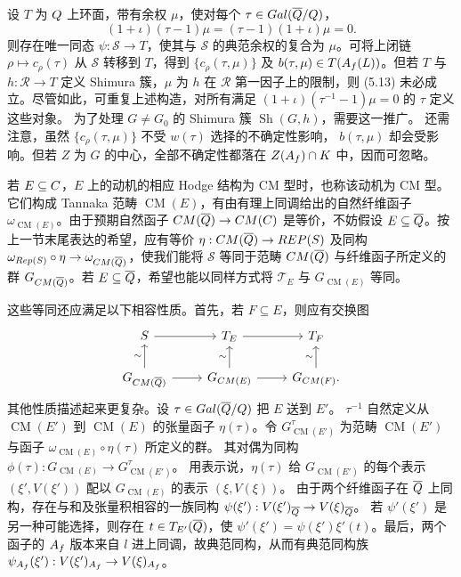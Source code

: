 设 $T$ 为 $Q$ 上环面，带有余权 $\mu$，使对每个
$\tau\in Gal(\overline{Q}/Q)$，
\begin{equation}
(1+\iota)(\tau-1)\mu=(\tau-1)(1+\iota)\mu=0.\tag{5.13}
\end{equation}
则存在唯一同态 $\psi:\mathcal S\to T$，使其与 $\mathcal S$ 的典范余权的复合为
$\mu$。可将上闭链 $\rho\mapsto c_\rho(\tau)$ 从 $\mathcal S$ 转移到 $T$，得到
$\{c_\rho(\tau,\mu)\}$ 及 $b(\tau,\mu)\in T(A_f(L))$。但若 $T$ 与
$h:\mathcal R\to T$ 定义 Shimura 簇，$\mu$ 为 $h$ 在 $\mathcal R$ 第一因子上的限制，则
(5.13) 未必成立。尽管如此，可重复上述构造，对所有满足
$(1+\iota)(\tau^{-1}-1)\mu=0$ 的 $\tau$ 定义这些对象。
为了处理 $G\ne G_0$ 的 Shimura 簇 $\operatorname{Sh}(G,h)$，需要这一推广。
还需注意，虽然 $\{c_\rho(\tau,\mu)\}$ 不受 $w(\tau)$ 选择的不确定性影响，
$b(\tau,\mu)$ 却会受影响。但若 $Z$ 为 $G$ 的中心，全部不确定性都落在
$Z(A_f)\cap K$ 中，因而可忽略。

若 $E\subseteq C$，$E$ 上的动机的相应 Hodge 结构为 CM 型时，也称该动机为 CM 型。
它们构成 Tannaka 范畴 $\operatorname{CM}(E)$，有由有理上同调给出的自然纤维函子
$\omega_{\operatorname{CM}(E)}$。由于预期自然函子
$CM(\overline{Q})\to CM(C)$ 是等价，不妨假设
$E\subseteq\overline{Q}$。按上一节末尾表达的希望，应有等价
$\eta:CM(\overline{Q})\to REP(S)$ 及同构
$\omega_{Rep(S)}\circ\eta\to\omega_{CM(\overline{Q})}$，使我们能将
$\mathcal S$ 等同于范畴 $CM(\overline{Q})$ 与纤维函子所定义的群
$G_{CM(\overline{Q})}$。若 $E\subseteq\overline{Q}$，希望也能以同样方式将
$\mathcal T_E$ 与 $G_{\operatorname{CM}(E)}$ 等同。

这些等同还应满足以下相容性质。首先，若 $F\subseteq E$，则应有交换图
\[
\begin{tikzcd}
\mathcal S\arrow[r]&\mathcal T_E\arrow[r]&\mathcal T_F\\
G_{\operatorname{CM}(\overline\Q)}\arrow[u,"\sim"]\arrow[r]&
G_{\operatorname{CM}(E)}\arrow[u,"\sim"]\arrow[r]&G_{\operatorname{CM}(F)}\arrow[u,"\sim"].
\end{tikzcd}
\]
其他性质描述起来更复杂。设 $\tau\in Gal(\overline{Q}/Q)$ 把 $E$ 送到 $E'$。
$\tau^{-1}$ 自然定义从 $\operatorname{CM}(E')$ 到 $\operatorname{CM}(E)$ 的张量函子
$\eta(\tau)$。令 $G_{\operatorname{CM}(E')}^\tau$ 为范畴
$\operatorname{CM}(E')$ 与函子 $\omega_{\operatorname{CM}(E)}\circ\eta(\tau)$ 所定义的群。
其对偶为同构 $\phi(\tau):G_{\operatorname{CM}(E)}\to G_{\operatorname{CM}(E')}^\tau$。
用表示说，$\eta(\tau)$ 给 $G_{\operatorname{CM}(E')}$ 的每个表示
$(\xi',V(\xi'))$ 配以 $G_{\operatorname{CM}(E)}$ 的表示 $(\xi,V(\xi))$。
由于两个纤维函子在 $\overline{Q}$ 上同构，存在与和及张量积相容的一族同构
$\psi(\xi'):V(\xi')_{\overline{Q}}\to V(\xi)_{\overline{Q}}$。
若 $\psi'(\xi')$ 是另一种可能选择，则存在 $t\in T_{E'}(\overline{Q})$，使
$\psi'(\xi')=\psi(\xi')\xi'(t)$。最后，两个函子的 $A_f$ 版本来自 $l$ 进上同调，故典范同构，从而有典范同构族
$\psi_{A_f}(\xi'):V(\xi')_{A_f}\to V(\xi)_{A_f}$。


